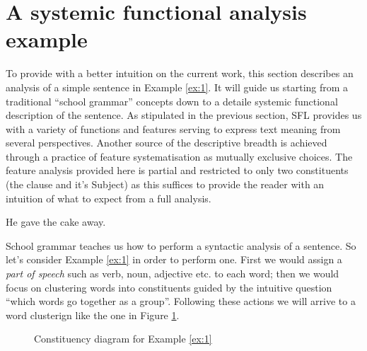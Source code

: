 \section{A systemic functional analysis example}
\label{sec:example}
To provide with a better intuition on the current work, this section describes an analysis of a simple sentence in Example \ref{ex:1}. It will guide us starting from a traditional ``school grammar'' concepts down to a detaile systemic functional description of the sentence. %
As stipulated in the previous section, SFL provides us with a variety of functions and features serving to express text meaning from several perspectives. Another source of the descriptive breadth is achieved through a practice of feature systematisation as mutually exclusive choices. %
The feature analysis provided here is partial and restricted to only two constituents (the clause and it's Subject) as this suffices to provide the reader with an intuition of what to expect from a full analysis.

\begin{exe}
    \ex\label{ex:1} He gave the cake away.
\end{exe}

School grammar teaches us how to perform a syntactic analysis of a sentence. So let's consider Example \ref{ex:1} in order to perform one. First we would assign a \textit{part of speech} such as verb, noun, adjective etc. to each word; then we would focus on clustering words into constituents guided by the intuitive question ``which words go together as a group''. Following these actions we will arrive to a word clusterign like the one in Figure \ref{fig:mcg-graph-example-simple-structure}.

\begin{figure}[!ht]
    \centering
    \caption{Constituency diagram for Example \ref{ex:1}}
    \label{fig:mcg-graph-example-simple-structure}
\end{figure}

